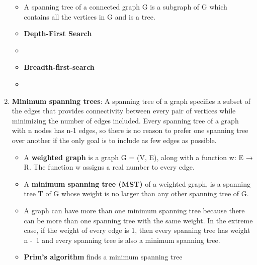 \documentclass[12pt,a4paper]{article}
\begin{document}
\begin{enumerate}
\begin{itemize}
    \item A spanning tree of a connected graph G is a subgraph of G which contains all the vertices in G and is a tree.
    \item \textbf{Depth-First Search}
    \item[]
    \item \textbf{Breadth-first-search}
    \item[]   
  \end{itemize}
  \item \textbf{Minimum spanning trees}: A spanning tree of a graph specifies a subset of the edges that provides connectivity between every pair of vertices while minimizing the number of edges included. Every spanning tree of a graph with n nodes has n-1 edges, so there is no reason to prefer one spanning tree over another if the only goal is to include as few edges as possible.
  \begin{itemize}
    \item A \textbf{weighted graph} is a graph G = (V, E), along with a function w: E → R. The function w assigns a real number to every edge.
    \item A \textbf{minimum spanning tree (MST)} of a weighted graph, is a spanning tree T of G whose weight is no larger than any other spanning tree of G.
    \item A graph can have more than one minimum spanning tree because there can be more than one spanning tree with the same weight. In the extreme case, if the weight of every edge is 1, then every spanning tree has weight n -\ 1 and every spanning tree is also a minimum spanning tree.
    \item \textbf{Prim's algorithm} finds a minimum spanning tree
  \end{itemize}
\end{enumerate}
\end{document}
